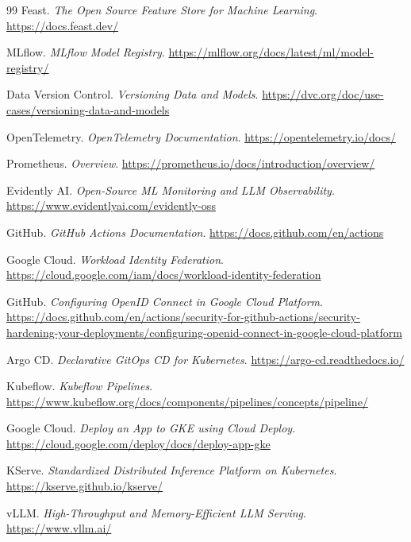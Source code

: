 \begin{thebibliography}{99}
Feast.
\newblock \textit{The Open Source Feature Store for Machine Learning}.
\newblock \url{https://docs.feast.dev/}

MLflow.
\newblock \textit{MLflow Model Registry}.
\newblock \url{https://mlflow.org/docs/latest/ml/model-registry/}

Data Version Control.
\newblock \textit{Versioning Data and Models}.
\newblock \url{https://dvc.org/doc/use-cases/versioning-data-and-models}

OpenTelemetry.
\newblock \textit{OpenTelemetry Documentation}.
\newblock \url{https://opentelemetry.io/docs/}

Prometheus.
\newblock \textit{Overview}.
\newblock \url{https://prometheus.io/docs/introduction/overview/}

Evidently AI.
\newblock \textit{Open-Source ML Monitoring and LLM Observability}.
\newblock \url{https://www.evidentlyai.com/evidently-oss}

GitHub.
\newblock \textit{GitHub Actions Documentation}.
\newblock \url{https://docs.github.com/en/actions}

Google Cloud.
\newblock \textit{Workload Identity Federation}.
\newblock \url{https://cloud.google.com/iam/docs/workload-identity-federation}

GitHub.
\newblock \textit{Configuring OpenID Connect in Google Cloud Platform}.
\newblock \url{https://docs.github.com/en/actions/security-for-github-actions/security-hardening-your-deployments/configuring-openid-connect-in-google-cloud-platform}

Argo CD.
\newblock \textit{Declarative GitOps CD for Kubernetes}.
\newblock \url{https://argo-cd.readthedocs.io/}

Kubeflow.
\newblock \textit{Kubeflow Pipelines}.
\newblock \url{https://www.kubeflow.org/docs/components/pipelines/concepts/pipeline/}

Google Cloud.
\newblock \textit{Deploy an App to GKE using Cloud Deploy}.
\newblock \url{https://cloud.google.com/deploy/docs/deploy-app-gke}

KServe.
\newblock \textit{Standardized Distributed Inference Platform on Kubernetes}.
\newblock \url{https://kserve.github.io/kserve/}

vLLM.
\newblock \textit{High-Throughput and Memory-Efficient LLM Serving}.
\newblock \url{https://www.vllm.ai/}


\end{thebibliography}
